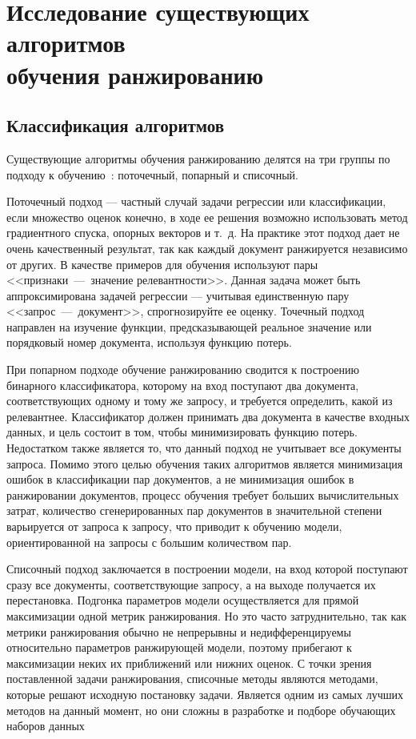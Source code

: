 \chapter{Исследование существующих алгоритмов \\обучения ранжированию}

\section{Классификация алгоритмов}

Существующие алгоритмы обучения ранжированию делятся на три группы по подходу к обучению~\cite{ML_for_SE}: поточечный, попарный и списочный.

Поточечный подход --- частный случай задачи регрессии или классификации, если множество оценок конечно, в ходе ее решения возможно использовать метод градиентного спуска, опорных векторов и т.~д. На практике этот подход дает не очень качественный результат, так как каждый документ ранжируется независимо от других. В качестве примеров для обучения используют пары <<признаки~---~значение релевантности>>. Данная задача может быть аппроксимирована задачей регрессии --- учитывая единственную пару <<запрос~---~документ>>, спрогнозируйте ее оценку. Точечный подход направлен на изучение функции, предсказывающей реальное значение или порядковый номер документа, используя функцию потерь.

При попарном подходе обучение ранжированию сводится к построению бинарного классификатора, которому на вход поступают два документа, соответствующих одному и тому же запросу, и требуется определить, какой из релевантнее. Классификатор должен принимать два документа в качестве входных данных, и цель состоит в том, чтобы минимизировать функцию потерь. Недостатком также является то, что данный подход не учитывает все документы запроса. Помимо этого целью обучения таких алгоритмов является минимизация ошибок в классификации пар документов, а не минимизация ошибок в ранжировании документов, процесс обучения требует больших вычислительных затрат, количество сгенерированных пар документов в значительной степени варьируется от запроса к запросу, что приводит к обучению модели, ориентированной на запросы с большим количеством пар.

Списочный подход заключается в построении модели, на вход которой поступают сразу все документы, соответствующие запросу, а на выходе получается их перестановка. Подгонка параметров модели осуществляется для прямой максимизации одной метрик ранжирования. Но это часто затруднительно, так как метрики ранжирования обычно не непрерывны и недифференцируемы относительно параметров ранжирующей модели, поэтому прибегают к максимизации неких их приближений или нижних оценок. С точки зрения поставленной задачи ранжирования, списочные методы являются методами, которые решают исходную постановку задачи. Является одним из самых лучших методов на данный момент, но они сложны в разработке и подборе обучающих наборов данных

